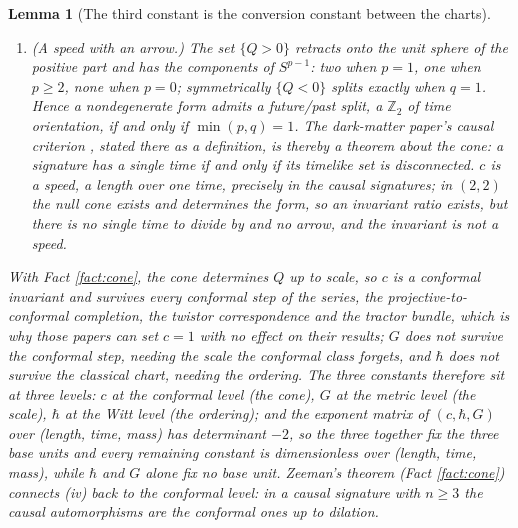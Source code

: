 \documentclass[11pt]{article}
\newtheorem{lemma}[theorem]{Lemma}
\theoremstyle{definition}
\begin{document}
\begin{lemma}[The third constant is the conversion constant between the charts]
\begin{enumerate}
\item[(iv)] \emph{(A speed with an arrow.)} The set $\{Q > 0\}$ retracts onto the unit sphere of the positive part and has the components of $S^{p-1}$: two when $p = 1$, one when $p \geq 2$, none when $p = 0$; symmetrically $\{Q < 0\}$ splits exactly when $q = 1$. Hence a nondegenerate form admits a future/past split, a $\mathbb{Z}_{2}$ of time orientation, if and only if $\min(p, q) = 1$. The dark-matter paper's causal criterion \cite[Prop.~3.1]{ButlerT14}, stated there as a definition, is thereby a theorem about the cone: a signature has a single time if and only if its timelike set is disconnected. $c$ is a speed, a length over one time, precisely in the causal signatures; in $(2,2)$ the null cone exists and determines the form, so an invariant ratio exists, but there is no single time to divide by and no arrow, and the invariant is not a speed.
\end{enumerate}
With Fact \ref{fact:cone}, the cone determines $Q$ up to scale, so $c$ is a conformal invariant and survives every conformal step of the series, the projective-to-conformal completion, the twistor correspondence and the tractor bundle, which is why those papers can set $c = 1$ with no effect on their results; $G$ does not survive the conformal step, needing the scale the conformal class forgets, and $\hbar$ does not survive the classical chart, needing the ordering. The three constants therefore sit at three levels: $c$ at the conformal level (the cone), $G$ at the metric level (the scale), $\hbar$ at the Witt level (the ordering); and the exponent matrix of $(c, \hbar, G)$ over (length, time, mass) has determinant $-2$, so the three together fix the three base units and every remaining constant is dimensionless over (length, time, mass), while $\hbar$ and $G$ alone fix no base unit. Zeeman's theorem (Fact \ref{fact:cone}) connects (iv) back to the conformal level: in a causal signature with $n \geq 3$ the causal automorphisms are the conformal ones up to dilation.
\end{lemma}
\end{document}
